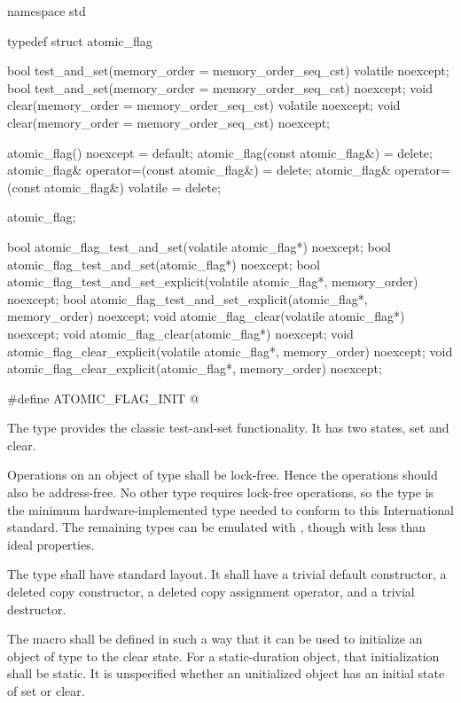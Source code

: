 \begin{codeblock}
namespace std {
  typedef struct atomic_flag {
    bool test_and_set(memory_order = memory_order_seq_cst) volatile noexcept;
    bool test_and_set(memory_order = memory_order_seq_cst) noexcept;
    void clear(memory_order = memory_order_seq_cst) volatile noexcept;
    void clear(memory_order = memory_order_seq_cst) noexcept;

    atomic_flag() noexcept = default;
    atomic_flag(const atomic_flag&) = delete;
    atomic_flag& operator=(const atomic_flag&) = delete;
    atomic_flag& operator=(const atomic_flag&) volatile = delete;
  } atomic_flag;

  bool atomic_flag_test_and_set(volatile atomic_flag*) noexcept;
  bool atomic_flag_test_and_set(atomic_flag*) noexcept;
  bool atomic_flag_test_and_set_explicit(volatile atomic_flag*, memory_order) noexcept;
  bool atomic_flag_test_and_set_explicit(atomic_flag*, memory_order) noexcept;
  void atomic_flag_clear(volatile atomic_flag*) noexcept;
  void atomic_flag_clear(atomic_flag*) noexcept;
  void atomic_flag_clear_explicit(volatile atomic_flag*, memory_order) noexcept;
  void atomic_flag_clear_explicit(atomic_flag*, memory_order) noexcept;

  #define ATOMIC_FLAG_INIT @\seebelow@
}
\end{codeblock}

\pnum
The  type provides the classic test-and-set functionality. It has two states, set and clear.

\pnum
Operations on an object of type  shall be lock-free. \enternote Hence
the operations should also be address-free. No other type requires lock-free operations,
so the  type is the minimum hardware-implemented type needed to
conform to this International standard. The remaining types can be emulated with
, though with less than ideal properties. \exitnote

\pnum
The  type shall have standard layout. It shall have a trivial default constructor, a deleted copy constructor, a deleted copy assignment operator, and a trivial destructor.

\pnum
The macro  shall be defined in such a way that it can be used to initialize an object of type  to the
clear state. For a static-duration object, that initialization shall be static. It is unspecified whether an
unitialized  object has an initial state of set or clear.\enterexample

